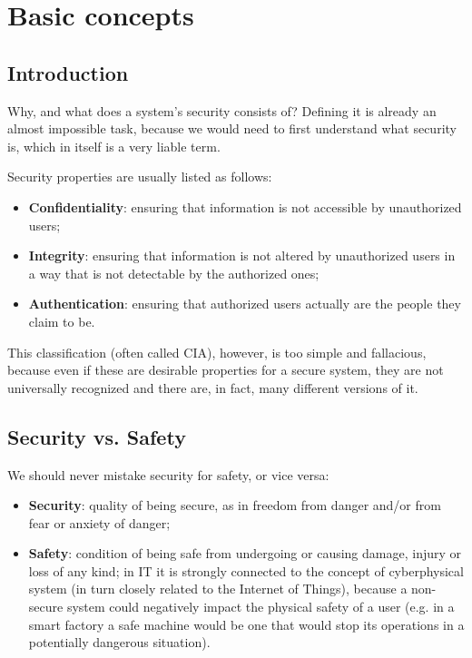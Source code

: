 \chapter{Basic concepts} %
\label{chap:bc}


\section{Introduction}
Why, and what does a system’s security consists of? Defining it is already an almost impossible task, because we would need to first understand what security is, which in itself is a very liable term.

Security properties are usually listed as follows:
\begin{itemize}
\item \textbf{Confidentiality}: ensuring that information is not accessible by unauthorized users;
\item \textbf{Integrity}: ensuring that information is not altered by unauthorized users in a way that is not detectable by the authorized ones;
\item \textbf{Authentication}: ensuring that authorized users actually are the people they claim to be.
\end{itemize}

This classification (often called CIA), however, is too simple and fallacious, because even if these are desirable properties for a secure system, they are not universally recognized and there are, in fact, many different versions of it.


\section{Security vs. Safety}
We should never mistake security for safety, or vice versa:

\begin{itemize}
\item \textbf{Security}: quality of being secure, as in freedom from danger and/or from fear or anxiety of danger;
\item \textbf{Safety}: condition of being safe from undergoing or causing damage, injury or loss of any kind; in IT it is strongly connected to the concept of cyberphysical system (in turn closely related to the Internet of Things), because a non-secure system could negatively impact the physical safety of a user (e.g. in a smart factory a safe machine would be one that would stop its operations in a potentially dangerous situation).
\end{itemize}

